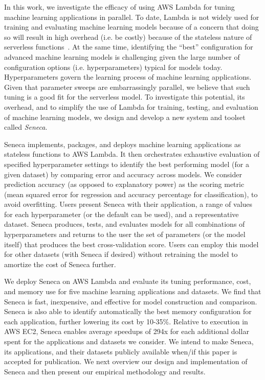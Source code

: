 In this work, we investigate the efficacy of using AWS Lambda
for tuning machine learning applications in parallel.
To date, Lambda is not widely used for training and evaluating
machine learning models because of a concern that 
doing so will result in high overhead (i.e. be costly) because
of the stateless nature of serverless functions~\cite{ref:onesteptwostep}.
At the same time, identifying the ``best'' configuration for advanced
machine learning models is challenging given the large number of configuration
options (i.e. hyperparameters) typical for models today.
Hyperparameters govern the learning process of machine learning applications.
Given that parameter sweeps are embarrassingly parallel, we believe
that such tuning is a good fit for the serverless model.
To investigate this potential, its overhead, and to simplify the 
use of Lambda for training, testing, and evaluation of machine learning models, 
we design and develop a new system and toolset called \textit{Seneca}.

Seneca implements, packages, and deploys 
machine learning applications as stateless functions to AWS Lambda.
It then orchestrates exhaustive evaluation of specified hyperparameter settings
to identify the best performing model (for a given dataset) by
comparing error and accuracy across models.  We consider
prediction accuracy (as opposed to explanatory power) as the
scoring metric (mean squared error for regression 
and accuracy percentage for classification), to avoid overfitting.
Users present Seneca with their application, a range of values for 
each hyperparameter (or the default can be used), and a representative dataset.
Seneca produces, tests, and evaluates models for all combinations 
of hyperparameters and returns to the user
the set of parameters (or the model itself) that produces
the best cross-validation score.
Users can employ this model for other datasets
(with Seneca if desired) without retraining the model to amortize the cost of Seneca further.

We deploy Seneca on AWS Lambda and evaluate its tuning performance, cost,
and memory use for five machine learning applications and datasets. We 
find that Seneca is fast, inexpensive, and effective for model 
construction and comparison. Seneca is also able to identify
automatically the
best memory configuration for each application, further lowering its cost
by 10-35\%. Relative to execution in AWS EC2, Seneca enables average speedups of 294x for each additional dollar 
spent for the applications and datasets we consider.
We intend to make Seneca, its applications, and their datasets publicly available
when/if this paper is accepted for publication.  
We next overview our design and implementation of Seneca and then
present our empirical methodology and results.